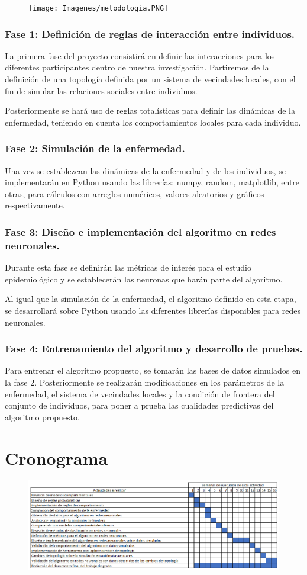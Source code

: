 \documentclass{article}
\begin{document}
\begin{figure}[h.]
  \centering
    \texttt{[image: Imagenes/metodologia.PNG]}
\end{figure}

\subsubsection*{Fase 1: Definición de reglas de interacción entre individuos.}
La primera fase del proyecto consistirá en definir las interacciones para los diferentes participantes dentro de nuestra investigación. Partiremos de la definición de una topología definida por un sistema de vecindades locales, con el fin de simular las relaciones sociales entre individuos.

Posteriormente se hará uso de reglas totalísticas para definir las dinámicas de la enfermedad, teniendo en cuenta los comportamientos locales para cada individuo. 
\subsubsection*{Fase 2: Simulación de la enfermedad.}
Una vez se establezcan las dinámicas de la enfermedad y de los individuos, se implementarán en Python usando las librerías: numpy, random, matplotlib, entre otras, para cálculos con arreglos numéricos, valores aleatorios y gráficos respectivamente.
\subsubsection*{Fase 3: Diseño e implementación del algoritmo en redes neuronales.}
Durante esta fase se definirán las métricas de interés para el estudio epidemiológico y se establecerán las neuronas que harán parte del algoritmo. 

Al igual que la simulación de la enfermedad, el algoritmo definido en esta etapa, se desarrollará sobre Python usando las diferentes librerías disponibles para redes neuronales. 
\subsubsection*{Fase 4: Entrenamiento del algoritmo y desarrollo de pruebas.}
Para entrenar el algoritmo propuesto, se tomarán las bases de datos simulados en la fase 2. Posteriormente se realizarán modificaciones en los parámetros de la enfermedad, el sistema de vecindades locales y la condición de frontera del conjunto de individuos, para poner a prueba las cualidades predictivas del algoritmo propuesto.  
\section{Cronograma}
\begin{figure}[h.]
  \centering
    \includegraphics[width=1.1\textwidth]{Imagenes/cronograma.PNG}
\end{figure}
\printbibliography
\end{document}
